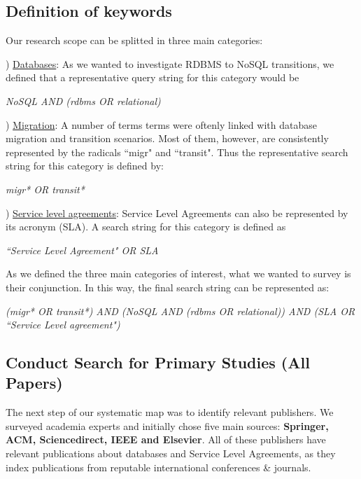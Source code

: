\documentclass[]{tEIS2e}
\theoremstyle{plain}
\theoremstyle{remark}
\begin{document}
\subsection{Definition of keywords}
\label{sec:sok}

Our research scope can be splitted in three main categories: 

) \underline{Databases}: As we wanted to investigate RDBMS to NoSQL transitions, we defined that a representative query string for this category would be 

\begin{center}
\textit{NoSQL AND (rdbms OR relational)}
\end{center}

) \underline{Migration}: A number of terms terms were oftenly linked with database migration and transition scenarios. Most of them, however, are consistently represented by the radicals ``migr" and ``transit". Thus the representative search string for this category is defined by: 


\begin{center}
\textit{migr* OR transit*}
\end{center}


) \underline{Service level agreements}: Service Level Agreements can also be represented by its acronym (SLA). 
A search string for this category is defined as 
\begin{center}
\textit{``Service Level Agreement" OR SLA}
\end{center}

As we defined the three main categories of interest, what we wanted to survey is their conjunction. 
In this way, the final search string can be represented as: 

\begin{center}
\textit{(migr* OR transit*) AND (NoSQL AND (rdbms OR relational)) AND (SLA OR ``Service Level agreement") 
}\end{center}

\subsection{Conduct Search for Primary Studies (All Papers)}
\label{sec:allPapers}

The next step of our systematic map was to identify relevant publishers. We surveyed academia experts and initially chose five main sources: \textbf{Springer, ACM, Sciencedirect, IEEE and Elsevier}. 
All of these publishers have relevant publications about databases and Service Level Agreements, as they index publications from reputable international conferences \& journals.  
\end{document}
